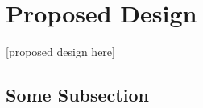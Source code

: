 \section{Proposed Design}
\label{section:propeseddesign}
[proposed design here]

\subsection{Some Subsection}


